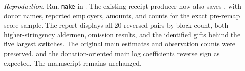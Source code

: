 \textit{Reproduction.} Run \texttt{make} in . The existing receipt producer now also saves , with donor names, reported employers, amounts, and counts for the exact pre-remap score sample. The report displays all 20 reversed pairs by block count, both higher-stringency aldermen, omission results, and the identified gifts behind the five largest switches. The original main estimates and observation counts were preserved, and the donation-oriented main log coefficients reverse sign as expected. The manuscript remains unchanged.
